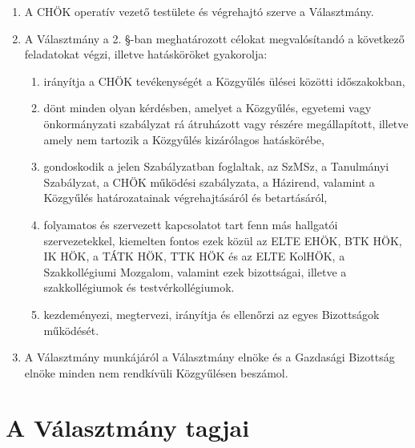 \documentclass{rulebook}
\begin{document}
\begin{enumerate}
	\item A CHÖK operatív vezető testülete és végrehajtó szerve a Választmány.
	\item A Választmány a 2. §-ban meghatározott célokat megvalósítandó a következő feladatokat végzi, illetve hatásköröket gyakorolja:
	\begin{enumerate}
		\item irányítja a CHÖK tevékenységét a Közgyűlés ülései közötti időszakokban,
		\item dönt minden olyan kérdésben, amelyet a Közgyűlés, egyetemi vagy önkormányzati szabályzat rá átruházott vagy részére megállapított, illetve amely nem tartozik a Közgyűlés kizárólagos hatáskörébe,
		\item gondoskodik a jelen Szabályzatban foglaltak, az SzMSz, a Tanulmányi Szabályzat, a CHÖK működési szabályzata, a Házirend, valamint a Közgyűlés határozatainak végrehajtásáról és betartásáról,
		\item folyamatos és szervezett kapcsolatot tart fenn más hallgatói szervezetekkel, kiemelten fontos ezek közül az ELTE EHÖK, BTK HÖK, IK HÖK, a TÁTK HÖK, TTK HÖK és az ELTE KolHÖK, a Szakkollégiumi Mozgalom, valamint ezek bizottságai, illetve a szakkollégiumok és testvérkollégiumok.
		\item kezdeményezi, megtervezi, irányítja és ellenőrzi az egyes Bizottságok működését.
	\end{enumerate}
	\item A Választmány munkájáról a Választmány elnöke és a Gazdasági Bizottság elnöke minden nem rendkívüli Közgyűlésen beszámol.
\end{enumerate}


\section{A Választmány tagjai}
\end{document}
